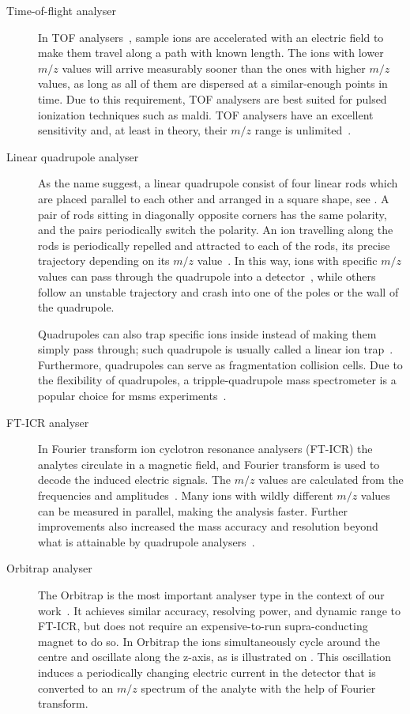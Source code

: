 \begin{description}
  \item[Time-of-flight analyser] In TOF analysers~\cite{stephens1946pulsed}, sample ions are accelerated with an electric field to make them travel along a path with known length. The ions with lower \(m/z\) values will arrive measurably sooner than the ones with higher \(m/z\) values, as long as all of them are dispersed at a similar-enough points in time. Due to this requirement, TOF analysers are best suited for pulsed ionization techniques such as \gls*{maldi}\@. TOF analysers have an excellent sensitivity and, at least in theory, their \(m/z\) range is unlimited~\cite{fuerstenau1995molecular}.
  \item[Linear quadrupole analyser] As the name suggest, a linear quadrupole consist of four linear rods which are placed parallel to each other and arranged in a square shape, see . A pair of rods sitting in diagonally opposite corners has the same polarity, and the pairs periodically switch the polarity. An ion travelling along the rods is periodically repelled and attracted to each of the rods, its precise trajectory depending on its \(m/z\) value~\cite{paul1990electromagnetic}. In this way, ions with specific \(m/z\) values can pass through the quadrupole into a detector~\cite{paul1953neues}, while others follow an unstable trajectory and crash into one of the poles or the wall of the quadrupole.

    Quadrupoles can also trap specific ions inside instead of making them simply pass through; such quadrupole is usually called a linear ion trap~\cite{mao2003h}. Furthermore, quadrupoles can serve as fragmentation collision cells. Due to the flexibility of quadrupoles, a tripple-quadrupole mass spectrometer is a popular choice for \gls*{msms} experiments~\cite{yost1978selected}.
  \item[FT-ICR analyser] In Fourier transform ion cyclotron resonance analysers (FT-ICR) the analytes circulate in a magnetic field, and Fourier transform is used to decode the induced electric signals. The \(m/z\) values are calculated from the frequencies and amplitudes~\cite{comisarow1974fourier}. Many ions with wildly different \(m/z\) values can be measured in parallel, making the analysis faster. Further improvements also increased the mass accuracy and resolution beyond what is attainable by quadrupole analysers~\cite{amster1996fourier, easterling1999routine}.
  \item[Orbitrap analyser] The Orbitrap is the most important analyser type in the context of our work~\cite{hu2005orbitrap}. It achieves similar accuracy, resolving power, and dynamic range to FT-ICR, but does not require an expensive-to-run supra-conducting magnet to do so. In Orbitrap the ions simultaneously cycle around the centre and oscillate along the z-axis, as is illustrated on . This oscillation induces a periodically changing electric current in the detector that is converted to an \(m/z\) spectrum of the analyte with the help of Fourier transform.


\end{description}
